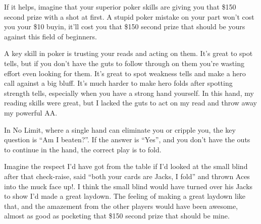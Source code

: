If it helps, imagine that your superior poker skills are giving
you that \$150 second prize with a shot at first. A stupid poker
mistake on your part won't cost you your \$10 buyin, it'll cost
you that \$150 second prize that should be yours against this
field of beginners.

A key skill in poker is trusting your reads and acting on them.
It's great to spot tells, but if you don't have the guts to follow
through on them you're wasting effort even looking for them. It's
great to spot weakness tells and make a hero call against a big bluff.
It's much harder to make hero folds after spotting strength tells,
especially when you have a strong hand yourself.
In this hand, my reading skills were great, but I lacked the guts to act
on my read and throw away my powerful AA.

In No Limit, where a single hand can eliminate you or cripple you, the key
question is ``Am I beaten?''. If the answer is ``Yes'', and you don't have
the outs to continue in the hand, the correct play is to fold.

Imagine the respect I'd have got from the table if I'd looked at the
small blind after that check-raise, said ``both your cards are
Jacks, I fold'' and thrown Aces into the muck face up!. I think the
small blind would have turned over his Jacks to show I'd made a great
laydown. The feeling of making a great laydown like that,
and the amazement from the other players would have been awesome, almost as
good as pocketing that \$150 second prize that should be mine.

